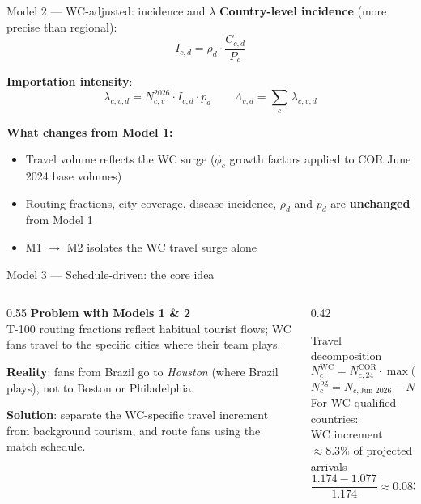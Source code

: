 \documentclass[aspectratio=169, 11pt]{beamer}
\begin{document}
\begin{frame}{Model 2 — WC-adjusted: incidence and $\lambda$}
  \textbf{Country-level incidence} (more precise than regional):
  \begin{equation}
    I_{c,d} = \rho_d \cdot \frac{C_{c,d}}{P_c}
    \tag{country incidence}
  \end{equation}

  \textbf{Importation intensity}:
  \begin{equation}
    \lambda_{c,v,d} = N_{c,v}^{2026} \cdot I_{c,d} \cdot p_d
    \qquad
    \Lambda_{v,d} = \sum_{c}\, \lambda_{c,v,d}
    \tag{WC-adj $\lambda$}
  \end{equation}

  \bigskip
  \textbf{What changes from Model 1:}
  \begin{itemize}
    \item Travel volume reflects the WC surge ($\phi_c$ growth factors
          applied to COR June 2024 base volumes)
    \item Routing fractions, city coverage, disease incidence,
          $\rho_d$ and $p_d$ are \textbf{unchanged} from Model 1
    \item[$\Rightarrow$] M1 $\to$ M2 isolates the WC travel surge alone
  \end{itemize}
\end{frame}

\begin{frame}{Model 3 — Schedule-driven: the core idea}
  \begin{columns}[T]
    \begin{column}{0.55\textwidth}
      \textbf{Problem with Models 1 \& 2}\\
      T-100 routing fractions reflect habitual tourist flows; WC fans
      travel to the specific cities where their team plays.

      \medskip
      \textbf{Reality}: fans from Brazil go to \textit{Houston}
      (where Brazil plays), not to Boston or Philadelphia.

      \medskip
      \textbf{Solution}: separate the WC-specific travel increment
      from background tourism, and route fans using the match schedule.
    \end{column}
    \begin{column}{0.42\textwidth}
      \begin{alertblock}{Travel decomposition}
        \[
          N_c^{\text{WC}} = N_{c,24}^{\text{COR}}
            \cdot \max\!\bigl(0,\; \phi_c - \phi_{\text{base}}\bigr)
        \]
        \[
          N_c^{\text{bg}} = N_{c,\text{Jun 2026}} - N_c^{\text{WC}}
        \]
        For WC-qualified countries:\\
        WC increment $\approx 8.3\%$ of projected arrivals
        \[
          \frac{1.174 - 1.077}{1.174} \approx 0.083
        \]
      \end{alertblock}
    \end{column}
  \end{columns}
\end{frame}
\end{document}
